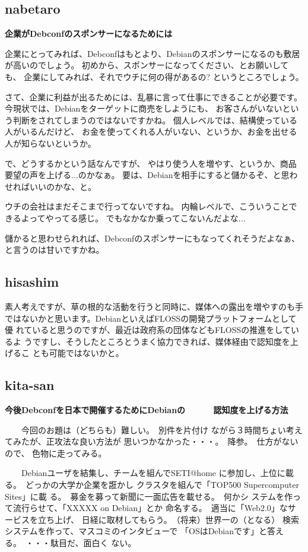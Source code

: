 \documentclass[mingoth,a4paper]{jsarticle}
\begin{document}
\subsection{nabetaro}

\textbf{企業がDebconfのスポンサーになるためには}

企業にとってみれば、Debconfはもとより、Debianのスポンサーになるのも敷居が高いのでしょう。
初めから、スポンサーになってください、とお願いしても、
企業にしてみれば、それでウチに何の得があるの? というところでしょう。

さて、企業に利益が出るためには、乱暴に言って仕事にできることが必要です。
今現状では、Debianをターゲットに商売をしようにも、
お客さんがいないという判断をされてしまうのではないですかね。
個人レベルでは、結構使っている人がいるんだけど、
お金を使ってくれる人がいない、というか、お金を出せる人が知らないというか。

で、どうするかという話なんですが、
やはり使う人を増やす、というか、商品要望の声を上げる...のかなぁ。
要は、Debianを相手にすると儲かるぞ、と思わせればいいのかな、と。

ウチの会社はまだそこまで行ってないですね。
内輪レベルで、こういうことできるよってやってる感じ。
でもなかなか乗ってこないんだよな...

儲かると思わせられれば、Debconfのスポンサーにもなってくれそうだよなぁ、
と言うのは甘いですかね。

\subsection{hisashim}

素人考えですが、草の根的な活動を行うと同時に、媒体への露出を増やすのも手
ではないかと思います。DebianといえばFLOSSの開発プラットフォームとして優
れていると思うのですが、最近は政府系の団体などもFLOSSの推進をしているよ
うですし、そうしたところとうまく協力できれば、媒体経由で認知度を上げるこ
とも可能ではないかと。


\subsection{kita-san}

\textbf{今後Debconfを日本で開催するためにDebianの
　　　認知度を上げる方法}

　　今回のお題は（どちらも）難しい。　別件を片付け
ながら３時間ちょい考えてみたが、正攻法な良い方法が
思いつかなかった・・・。　降参。　仕方がないので、
色物に走ってみる。

　　Debianユーザを結集し、チームを組んでSETI@home
に参加し、上位に載る。　どっかの大学か企業を誑かし
クラスタを組んで「TOP500 Supercomputer Sites」に載
る。　募金を募って新聞に一面広告を載せる。　何かシ
ステムを作って流行らせて、「XXXXX on Debian」とか
命名する。　適当に「Web2.0」なサービスを立ち上げ、
日経に取材してもらう。　（将来）世界一の（となる）
検索システムを作って、マスコミのインタビューで
「OSはDebianです」と答える。　・・・駄目だ、面白く
ない。
\end{document}
